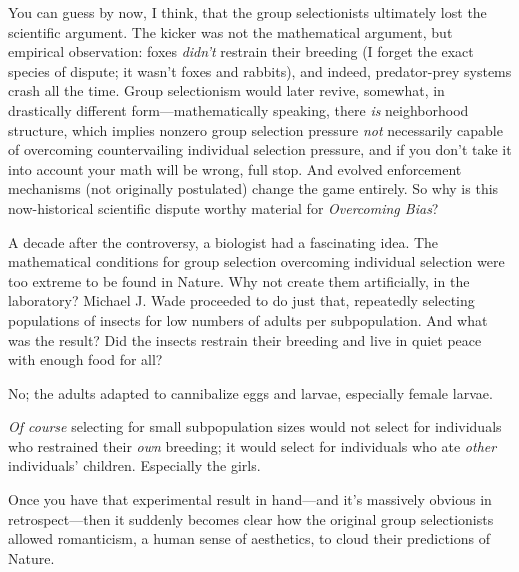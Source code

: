{
 You can guess by now, I think, that the group selectionists
ultimately lost the scientific argument. The kicker was not the
mathematical argument, but empirical observation: foxes
\textit{didn't} restrain their breeding (I forget the
exact species of dispute; it wasn't foxes and rabbits),
and indeed, predator-prey systems crash all the time. Group
selectionism would later revive, somewhat, in drastically different
form---mathematically speaking, there \textit{is} neighborhood
structure, which implies nonzero group selection pressure \textit{not}
necessarily capable of overcoming countervailing individual selection
pressure, and if you don't take it into account your
math will be wrong, full stop. And evolved enforcement mechanisms (not
originally postulated) change the game entirely. So why is this
now-historical scientific dispute worthy material for
\textit{Overcoming Bias}?}

{
 A decade after the controversy, a biologist had a fascinating
idea. The mathematical conditions for group selection overcoming
individual selection were too extreme to be found in Nature. Why not
create them artificially, in the laboratory? Michael J. Wade proceeded
to do just that, repeatedly selecting populations of insects for low
numbers of adults per subpopulation. And what was
the result? Did the insects restrain their breeding and live in quiet
peace with enough food for all?}

{
 No; the adults adapted to cannibalize eggs and larvae, especially
female larvae.}

{
 \textit{Of course} selecting for small subpopulation sizes would
not select for individuals who restrained their \textit{own} breeding;
it would select for individuals who ate \textit{other}
individuals' children. Especially the girls.}

{
 Once you have that experimental result in hand---and
it's massively obvious in retrospect---then it suddenly
becomes clear how the original group selectionists allowed romanticism,
a human sense of aesthetics, to cloud their predictions of Nature.}

